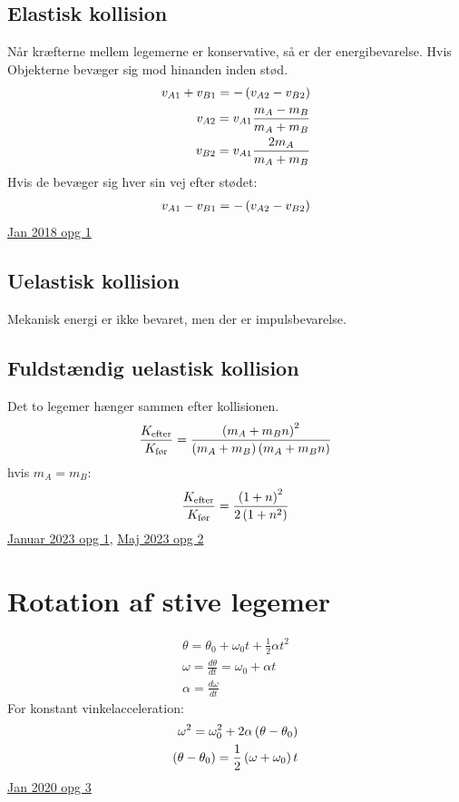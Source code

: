 \documentclass[a4paper,oneside,article]{memoir}
\begin{document}
\subsection{Elastisk kollision} \label{scc:elastiskkollision}
Når kræfterne mellem legemerne er konservative, så er der energibevarelse. 
Hvis Objekterne bevæger sig mod hinanden inden stød. 
\begin{align*}
    v_{A1}+v_{B1} = -\br{v_{A2}-v_{B2}} \\
    v_{A2}=v_{A1} \frac{m_A-m_B}{m_A+m_B}\\
    v_{B2} = v_{A1}\frac{2m_A}{m_A+m_B}
\end{align*}
Hvis de bevæger sig hver sin vej efter stødet: 
\begin{align*}
     v_{A1}-v_{B1} = -\br{v_{A2}-v_{B2}}
\end{align*}
\hyperref[asc:Jan 2018 opg 1]{Jan 2018 opg 1}
\subsection{Uelastisk kollision} \label{scc:uelastiskkollision}
Mekanisk energi er ikke bevaret, men der er impulsbevarelse. 
\subsection{Fuldstændig uelastisk kollision} \label{scc:fuldstændiguelastiskkollision}
Det to legemer hænger sammen efter kollisionen. 
\begin{align*}
    \frac{K_{\text{efter}}}{K_\text{før}}=\frac{\br{m_A+m_Bn}^2}{\br{m_A+m_B}\br{m_A+m_Bn}}
\end{align*}
hvis $m_A=m_B$: 
\begin{align*}
    \frac{K_\text{efter}}{K_\text{før}} = \frac{\br{1+n}^2}{2\br{1+n^2}}
\end{align*}
\hyperref[asc:Januar 2023 opg 1]{Januar 2023 opg 1}, \hyperref[asc:Maj 2023 opg 2]{Maj 2023 opg 2}

\section{Rotation af stive legemer} \label{sc:rotation}
\begin{align*}
    \theta = \theta_0+\omega_0t+\frac{1}{2}\alpha t^2\\
    \omega = \frac{d\theta}{dt} = \omega_0+\alpha t \\
    \alpha = \frac{d\omega}{dt}
\end{align*}
For konstant vinkelacceleration: 
\begin{align*}
    \omega^2=\omega_0^2+2\alpha \br{\theta-\theta_0}\\
    \br{\theta-\theta_0} = \frac{1}{2}\br{\omega+\omega_0}t
\end{align*}
\hyperref[asc:Jan 2020 opg 3]{Jan 2020 opg 3}
\end{document}
